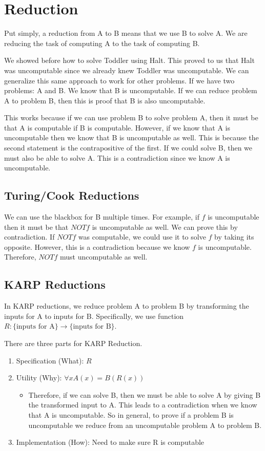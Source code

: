 \section{Reduction}
Put simply, a reduction from A to B means that we use B to solve A. We are reducing the task of computing A to the task of computing B. 

We showed before how to solve Toddler using Halt. This proved to us that Halt was uncomputable since we already knew Toddler was uncomputable. We can generalize this same approach to work for other problems. If we have two problems: A and B. We know that B is uncomputable. If we can reduce problem A to problem B, then this is proof that B is also uncomputable.

This works because if we can use problem B to solve problem A, then it must be that A is computable if B is computable. However, if we know that A is uncomputable then we know that B is uncomputable as well. This is because the second statement is the contrapositive of the first. If we could solve B, then we must also be able to solve A. This is a contradiction since we know A is uncomputable.

\subsection*{Turing/Cook Reductions}
We can use the blackbox for B multiple times. For example, if $f$ is uncomputable then it must be that $NOTf$ is uncomputable as well. We can prove this by contradiction. If $NOTf$ was computable, we could use it to solve $f$ by taking its opposite. However, this is a contradiction because we know $f$ is uncomputable. Therefore, $NOTf$ must uncomputable as well.

\subsection*{KARP Reductions}
In KARP reductions, we reduce problem A to problem B by transforming the inputs for A to inputs for B. Specifically, we use function $R: \{\text{inputs for A}\} \rightarrow \{ \text{inputs for B}\}$. 

There are three parts for KARP Reduction.
\begin{enumerate}
    \item Specification (What): $R$
    \item Utility (Why): $\forall x A(x) = B(R(x))$
    \begin{itemize}
        \item Therefore, if we can solve B, then we must be able to solve A by giving B the transformed input to A. This leads to a contradiction when we know that A is uncomputable. So in general, to prove if a problem B is uncomputable we reduce from an uncomputable problem A to problem B. 
    \end{itemize}
    \item Implementation (How): Need to make sure R is computable
\end{enumerate}

